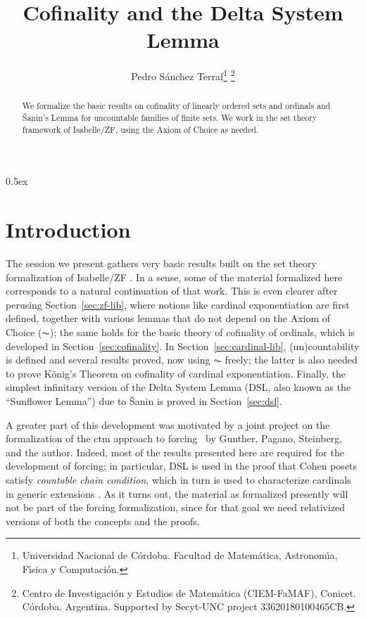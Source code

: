 \documentclass[11pt,a4paper]{article}
\begin{document}
\title{Cofinality and the Delta System Lemma}
\author{
  Pedro S\'anchez Terraf\thanks{Universidad Nacional de C\'ordoba. 
    Facultad de Matem\'atica, Astronom\'{\i}a,  F\'{\i}sica y
    Computaci\'on.}
  \thanks{%
    Centro de Investigaci\'on y Estudios de Matem\'atica
    (CIEM-FaMAF), Conicet. C\'ordoba. Argentina.
    Supported by Secyt-UNC project 33620180100465CB.}
}
\maketitle

\begin{abstract}
  We formalize the basic results on cofinality of linearly ordered
  sets and ordinals and \v{S}anin's Lemma for uncountable families of
  finite sets. We work in the set theory framework of
  Isabelle/ZF, using the Axiom of Choice as needed.
\end{abstract}


\tableofcontents

\parindent 0pt\parskip 0.5ex

\section{Introduction}

The session we present gathers very basic results built on the set
theory formalization of Isabelle/ZF
\cite{DBLP:journals/jar/PaulsonG96}. In a sense, some of the material
formalized here corresponds to a natural continuation of that
work. This is even clearer after perusing Section~\ref{sec:zf-lib},
where notions like cardinal exponentiation are first defined, together
with various lemmas that do not depend on the Axiom of Choice ($\AC$);
the same holds for the basic theory of cofinality of ordinals, which
is developed in Section~\ref{sec:cofinality}. In
Section~\ref{sec:cardinal-lib}, (un)countability is defined
and several results proved, now using $\AC$ freely; the latter is also
needed to prove König's Theorem on cofinality of cardinal
exponentiation. Finally, the simplest infinitary version of the Delta
System Lemma (DSL, also known as the ``Sunflower Lemma'') due to  \v{S}anin
is proved in Section~\ref{sec:dsl}.

A greater part of this development was motivated by a joint project on
the formalization of the ctm approach to
forcing~\cite{2020arXiv200109715G} by Gunther, Pagano, Steinberg, and
the author. Indeed, most of the results presented here are required
for the development of forcing; in particular, DSL is used in the
proof that Cohen posets satisfy \emph{countable chain condition}, which
in turn is used to characterize cardinals in generic extensions
\cite[Chap.~IV]{kunen2011set}. As it turns out, the material as
formalized presently will not be part of the forcing formalization,
since for that goal we need relativized versions of both the
concepts and the proofs.





\end{document}

